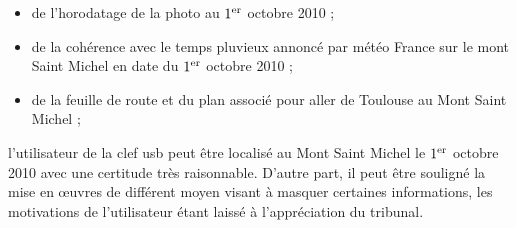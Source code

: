 \documentclass[a4paper,11pt]{article}
\begin{document}
\begin{itemize}
    \item de l’horodatage de la photo au $1^{\rm er}$ octobre 2010 ;
    \item de la cohérence avec le temps pluvieux annoncé par météo France sur le
        mont Saint Michel en date du $1^{\rm er}$ octobre 2010 ;
    \item de la feuille de route et du plan associé pour aller de Toulouse au
        Mont Saint Michel ;
\end{itemize}
l’utilisateur de la clef usb peut être localisé au Mont Saint Michel le
$1^{\rm er}$ octobre 2010 avec une certitude très raisonnable.
D’autre part, il peut être souligné la mise en œuvres de différent moyen visant
à masquer certaines informations, les motivations de l’utilisateur
étant laissé à l’appréciation du tribunal.
\end{document}
